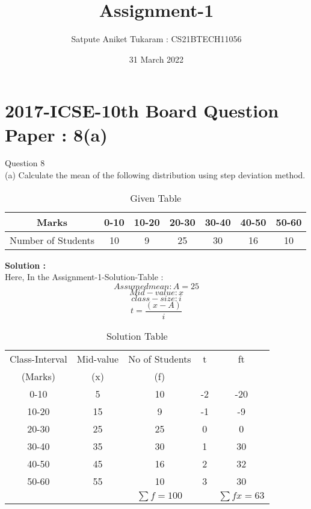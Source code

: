 \documentclass[12pt, a4paper, twocolumn]{article}
\title{Assignment-1}
\author{Satpute Aniket Tukaram : CS21BTECH11056}
\date{31 March 2022}
\begin{document}
\maketitle
\section{2017-ICSE-10th Board Question Paper : 8(a)}
Question 8\\

(a)	Calculate the mean of the following distribution using step deviation method.\\

\begin{table}[h!]
\center
\resizebox{\columnwidth}{!}
{
\begin{tabular}{|c|c|c|c|c|c|c|}
\hline
Marks & 0-10 & 10-20 & 20-30 & 30-40 & 40-50 & 50-60 \\
\hline
Number of Students & 10 & 9 & 25 & 30 & 16 & 10 \\
\hline
\end{tabular}
}
\caption{ Given Table }
\end{table}
\textbf{ Solution : }\\
Here, In the Assignment-1-Solution-Table :\\
\begin{equation*}
Assumed mean : A=25
\end{equation*}
\begin{equation*}
Mid-value : x
\end{equation*}
\begin{equation*}
class-size : i
\end{equation*}
\begin{equation*}
t = \frac{(x-A)}{i}
\end{equation*}
\begin{table}[h!]
\center
\resizebox{\columnwidth}{!}
{
\begin{tabular}{|c|c|c|c|c|}
\hline
Class-Interval & Mid-value & No of Students & t & ft\\
(Marks) & (x) & (f) & & \\
\hline
0-10 & 5 & 10 & -2 & -20 \\
\hline
10-20 & 15 & 9 & -1 & -9\\
\hline
20-30 & 25 & 25 & 0 & 0\\
\hline
30-40 & 35 & 30 & 1 & 30\\
\hline
40-50 & 45 & 16 & 2 & 32\\
\hline
50-60 & 55 & 10 & 3 & 30\\
\hline
 	&		 & 		$ 	\sum f = 100$ 		 &	 &	$ \sum fx = 63$		\\
 \hline
\end{tabular}
}
\caption{ Solution Table  }
\end{table}
\end{document}
